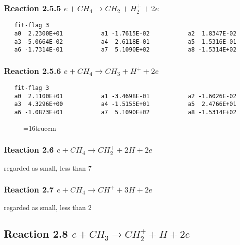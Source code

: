 \documentclass[12pt]{article}
\begin{document}
\subsubsection{
Reaction 2.5.5     $e + CH_{4} \rightarrow CH_{2} + H_{2}^{+} + 2e$
}
 
\begin{small}\begin{verbatim} 
   fit-flag 3
   a0  2.2300E+01           a1 -1.7615E-02           a2  1.8347E-02 
   a3 -5.0664E-02           a4  2.6118E-01           a5  1.5316E-01 
   a6 -1.7314E-01           a7  5.1090E+02           a8 -1.5314E+02
 \end{verbatim}\end{small}


\subsubsection{
Reaction 2.5.6     $e + CH_{4} \rightarrow CH_{3} + H^{+} + 2e $
}
 
\begin{small}\begin{verbatim} 
   fit-flag 3
   a0  2.1100E+01           a1 -3.4698E-01           a2 -1.6026E-02 
   a3  4.3296E+00           a4 -1.5155E+01           a5  2.4766E+01 
   a6 -1.0873E+01           a7  5.1090E+02           a8 -1.5314E+02
 \end{verbatim}\end{small}

 
\begin{figure} \label{met.1_2.5_2.6_2.7}
\epsfxsize=16truecm
\end{figure}
\newpage

\subsubsection{
Reaction 2.6    
$e + CH_{4} \rightarrow CH_{2}^+ + 2 H + 2e $
}
regarded as small, less than 7%

\subsubsection{
Reaction 2.7       
$e + CH_{4} \rightarrow CH^+ + 3 H + 2e $
}
regarded as small, less than 2%

\subsection{
Reaction 2.8      $e + CH_3 \rightarrow  CH_2^+ + H + 2e$
}
 
\end{document}
